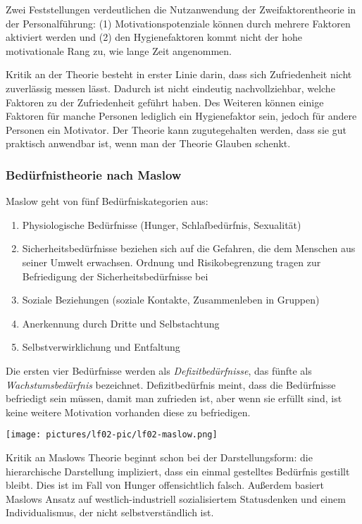 Zwei Feststellungen verdeutlichen die Nutzanwendung der Zweifaktorentheorie in der Personalführung: (1) Motivationspotenziale können durch mehrere Faktoren aktiviert werden und (2) den Hygienefaktoren kommt nicht der hohe motivationale Rang zu, wie lange Zeit angenommen.

Kritik an der Theorie besteht in erster Linie darin, dass sich Zufriedenheit nicht zuverlässig messen lässt. Dadurch ist nicht eindeutig nachvollziehbar, welche Faktoren zu der Zufriedenheit geführt haben. Des Weiteren können einige Faktoren für manche Personen lediglich ein Hygienefaktor sein, jedoch für andere Personen ein Motivator. Der Theorie kann zugutegehalten werden, dass sie gut praktisch anwendbar ist, wenn man der Theorie Glauben schenkt.

\subsubsection{Bedürfnistheorie nach Maslow}

Maslow geht von fünf Bedürfniskategorien aus:
\begin{enumerate}
	\item Physiologische Bedürfnisse (Hunger, Schlafbedürfnis, Sexualität)
	\item Sicherheitsbedürfnisse beziehen sich auf die Gefahren, die dem Menschen aus seiner Umwelt erwachsen. Ordnung und Risikobegrenzung tragen zur Befriedigung der Sicherheitsbedürfnisse bei
	\item Soziale Beziehungen (soziale Kontakte, Zusammenleben in Gruppen)
	\item Anerkennung durch Dritte und Selbstachtung
	\item Selbstverwirklichung und Entfaltung
\end{enumerate}

Die ersten vier Bedürfnisse werden als {\it Defizitbedürfnisse}, das fünfte als {\it Wachstumsbedürfnis} bezeichnet. Defizitbedürfnis meint, dass die Bedürfnisse befriedigt sein müssen, damit man zufrieden ist, aber wenn sie erfüllt sind, ist keine weitere Motivation vorhanden diese zu befriedigen.

\texttt{[image: pictures/lf02-pic/lf02-maslow.png]}

Kritik an Maslows Theorie beginnt schon bei der Darstellungsform: die hierarchische Darstellung impliziert, dass ein einmal gestelltes Bedürfnis gestillt bleibt. Dies ist im Fall von Hunger offensichtlich falsch. Außerdem basiert Maslows Ansatz auf westlich-industriell sozialisiertem Statusdenken und einem Individualismus, der nicht selbstverständlich ist.

